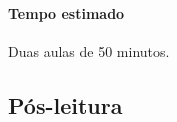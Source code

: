 \documentclass[12pt]{extarticle}
\begin{document}
\paragraph{Tempo estimado} Duas aulas de 50 minutos.

\subsection{Pós-leitura}








\end{document}
